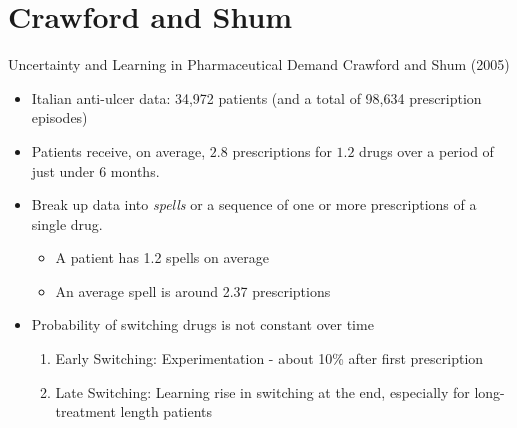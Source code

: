 \documentclass[xcolor=pdftex,dvipsnames,table,mathserif,aspectratio=169]{beamer}
\begin{document}
\section*{Crawford and Shum}

\begin{frame}{Uncertainty and Learning in Pharmaceutical Demand}
Crawford and Shum (2005)
\begin{itemize}
\item  Italian anti-ulcer data: 34,972 patients (and a total of 98,634 prescription episodes)
\item Patients receive, on average, $2.8$ prescriptions for $1.2$ drugs over a period of just under 6 months.
\item Break up data into \textit{spells} or a sequence of one or more prescriptions of a single drug.
\begin{itemize}
\item A patient has 1.2 spells on average
\item An average spell is around 2.37 prescriptions
\end{itemize}
\item Probability of switching drugs is not constant over time
\begin{enumerate}
\item Early Switching: \alert{Experimentation} - about 10\% after first prescription
\item Late Switching: \alert{Learning} rise in switching at the end, especially for long-treatment length patients
\end{enumerate}
\end{itemize}
\end{frame}
\end{document}
